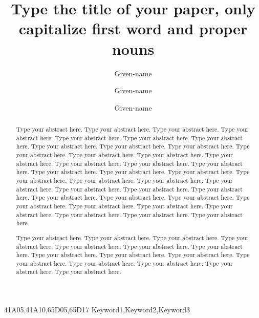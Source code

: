 \documentclass[times,referee,twocolumn,final,authoryear]{elsarticle}
\begin{document}
\begin{frontmatter}

\title{Type the title of your paper, only capitalize first
word and proper nouns}

\author[1]{Given-name } 
\author[2]{Given-name }
\author[2]{Given-name }

\address[1]{Affiliation 1, Address, City and Postal Code, Country}
\address[2]{Affiliation 2, Address, City and Postal Code, Country}



\begin{abstract}
Type your abstract here. Type your abstract here. Type your abstract
here. Type your abstract here. Type your abstract here. Type your
abstract here. Type your abstract here. Type your abstract here. Type
your abstract here. Type your abstract here. Type your abstract here.
Type your abstract here. Type your abstract here.
Type your abstract here. Type your abstract here. Type your abstract
here. Type your abstract here. Type your abstract here. Type your
abstract here. Type your abstract here. Type your abstract here. Type
your abstract here. Type your abstract here. Type your abstract here.
Type your abstract here. Type your abstract here.
Type your abstract here. Type your abstract here. Type your abstract
here. Type your abstract here. Type your abstract here. Type your
abstract here. Type your abstract here. Type your abstract here. Type
your abstract here. Type your abstract here. Type your abstract here.


Type your abstract here. Type your abstract here.
Type your abstract here. Type your abstract here. Type your abstract
here. Type your abstract here. Type your abstract here. Type your
abstract here. Type your abstract here. Type your abstract here. Type
your abstract here. Type your abstract here. Type your abstract here.
Type your abstract here. Type your abstract here.
\end{abstract}

\begin{keyword}
\MSC 41A05\sep 41A10\sep 65D05\sep 65D17
\KWD Keyword1\sep Keyword2\sep Keyword3

\end{keyword}

\end{frontmatter}
\end{document}
